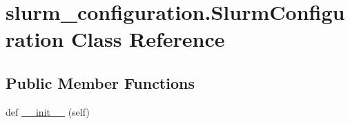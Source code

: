 \hypertarget{classslurm__configuration_1_1SlurmConfiguration}{}\section{slurm\+\_\+configuration.\+Slurm\+Configuration Class Reference}
\label{classslurm__configuration_1_1SlurmConfiguration}


 


\subsection*{Public Member Functions}
\begin{DoxyCompactItemize}
\item 
def \hyperlink{classslurm__configuration_1_1SlurmConfiguration_a89b3570db613c78edb099fee9661395c}{\+\_\+\+\_\+init\+\_\+\+\_\+} (self)
\end{DoxyCompactItemize}
